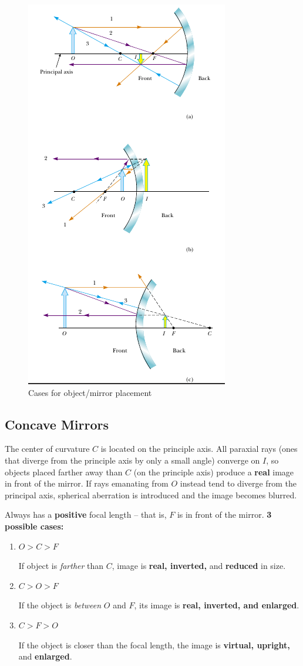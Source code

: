 \documentclass[a4paper,10pt]{report}
\begin{document}
\begin{figure}[h!]
  \begin{centering}
  \begin{center}
  \includegraphics[width=0.5\linewidth]{./Images/3mirrors.png}
  \caption{Cases for object/mirror placement}
  \label{fig:3_mirrors}
  \end{center}
  \par\end{centering}
  \end{figure}

\subsection{Concave Mirrors}
The center of curvature $C$ is located on the principle axis. All paraxial rays (ones that diverge from the principle axis by only a small angle) converge on $I$, so objects placed farther away than $C$ (on the principle axis) produce a \textbf{real} image in front of the mirror. If rays emanating from $O$ instead tend to diverge from the principal axis, spherical aberration is introduced and the image becomes blurred.

Always has a \textbf{positive} focal length -- that is, $F$ is in front of the mirror.
\textbf{3 possible cases:}

\begin{enumerate}
 \item $O > C > F$

 If object is \textit{farther} than $C$, image is \textbf{real, inverted,} and \textbf{reduced} in size.

 \item $C > O > F$

 If the object is \textit{between} $O$ and $F$, its image is \textbf{real, inverted, and enlarged}.

 \item $C > F > O$

 If the object is closer than the focal length, the image is \textbf{virtual, upright,} and \textbf{enlarged}.
\end{enumerate}
\end{document}

